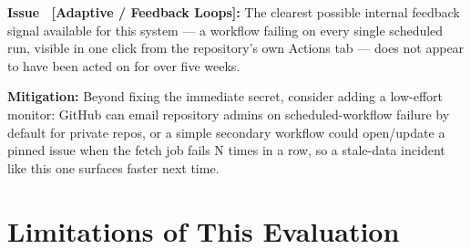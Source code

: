 \documentclass[12pt, a4paper]{article}
\newcounter{issue}
\newcommand{\issuelabel}[2]{%
  \stepcounter{issue}%
  \begin{mdframed}[style=alertbox]
  \textbf{Issue \theissue\ [\textcolor{ehaRed}{#1}]:} #2
  \end{mdframed}%
}
\newcommand{\mitigation}[1]{%
  \begin{mdframed}[style=mitigbox]
  \textbf{\textcolor{ehaBlue}{Mitigation:}} #1
  \end{mdframed}%
}
\begin{document}
\issuelabel{Adaptive / Feedback Loops}{The clearest possible internal feedback signal available for this system --- a workflow failing on every single scheduled run, visible in one click from the repository's own Actions tab --- does not appear to have been acted on for over five weeks.}
\mitigation{Beyond fixing the immediate secret, consider adding a low-effort monitor: GitHub can email repository admins on scheduled-workflow failure by default for private repos, or a simple secondary workflow could open/update a pinned issue when the fetch job fails N times in a row, so a stale-data incident like this one surfaces faster next time.}

\clearpage

\section{Limitations of This Evaluation}
\end{document}
